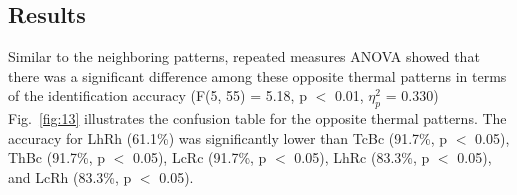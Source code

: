 \documentclass[preprint,12pt]{elsarticle}
\begin{document}
\subsection{Results}


Similar to the neighboring patterns, repeated measures ANOVA showed that there was a significant difference among these opposite thermal patterns in terms of the identification accuracy (F(5, 55) = 5.18, p $<$ 0.01, $\eta_p^2$ = 0.330) Fig.~\ref{fig:13} illustrates the confusion table for the opposite thermal patterns. The accuracy for LhRh (61.1\%) was significantly lower than TcBc (91.7\%, p $<$ 0.05), ThBc (91.7\%, p $<$ 0.05), LcRc (91.7\%, p $<$ 0.05), LhRc (83.3\%, p $<$ 0.05), and LcRh (83.3\%, p $<$ 0.05).

\end{document}
